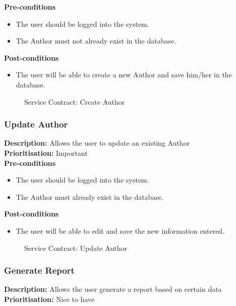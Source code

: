 \documentclass[a4paper]{article}
\begin{document}
	\textbf{Pre-conditions}
	\begin{itemize}
		\item The user should be logged into the system.
		\item The Author must not already exist in the database.
	\end{itemize}
	
	\textbf{Post-conditions}
	\begin{itemize}
		\item The user will be able to create a new Author and save him/her in the database.
	\end{itemize}
	
	\begin{figure}[H]
		\centering
		\caption{Service Contract: Create Author}
	\end{figure}
	
	\pagebreak
	\subsubsection{Update Author}
	\textbf{Description:} Allows the user to update an existing Author\\
	\textbf{Prioritisation:} Important\\
	
	\textbf{Pre-conditions}
	\begin{itemize}
		\item The user should be logged into the system.
		\item The Author must already exist in the database.
	\end{itemize}
	
	\textbf{Post-conditions}
	\begin{itemize}
		\item The user will be able to edit and save the new information entered.
	\end{itemize}
	\begin{figure}[H]
		\centering
		\caption{Service Contract: Update Author}
	\end{figure}
	
	\pagebreak
	\subsubsection{Generate Report}
	\textbf{Description:} Allows the user generate a report based on certain data\\
	\textbf{Prioritisation:} Nice to have\\
	
\end{document}
